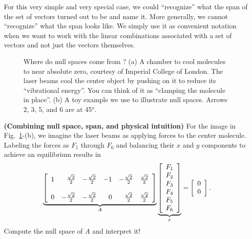 For this very simple and very special case, we could ``recognize'' what the span of the set of vectors turned out to be and name it. More generally, we cannot ``recognize'' what the span looks like. We simply use it as convenient notation when we want to work with the linear combinations associated with a set of vectors and not just the vectors themselves. 


\begin{figure}[htb]%
\centering
{}
\hspace{5pt}%
%
\caption[]{Where do null spaces come from ? (a) A chamber to cool molecules to near absolute zero, courtesy of Imperial College of London. The laser beams cool the center object by pushing on it to reduce its ``vibrational energy''. You can think of it as ``clamping the molecule in place''. (b) A toy example we use to illustrate null spaces. Arrows 2, 3, 5, and 6 are at 45$^o$.}
    \label{fig:NullSpace}
\end{figure}


\begin{example}
\label{ex:NullSpaceLaserCooling} \textbf{(Combining null space, span, and physical intuition)}
For the image in Fig.~\ref{fig:NullSpace}-(b), we imagine the laser beams as applying forces to the center molecule. Labeling the forces as $F_1$ through $F_6$ and balancing their $x$ and $y$ components to achieve an equilibrium results in 
\begin{equation}
\label{eq:CoolingMolecules}
    \underbrace{\left[\begin{array}{rrrrrr}  1 & \frac{\sqrt{2}}{2} & -\frac{\sqrt{2}}{2} & -1 & -\frac{\sqrt{2}}{2} & \frac{\sqrt{2}}{2} \bigskip \\
     0& -\frac{\sqrt{2}}{2} & -\frac{\sqrt{2}}{2} & 0 & \frac{\sqrt{2}}{2} & \frac{\sqrt{2}}{2}\end{array} \right]}_{A} \underbrace{\left[\begin{array}{c} F_1\\F_2 \\  F_3\\F_4 \\ F_5\\F_6 \\ \end{array} \right]}_{x} = \left[\begin{array}{c}  0\\ 0  \end{array} \right].
\end{equation}
Compute the null space of $A$ and interpret it!
 \end{example}

